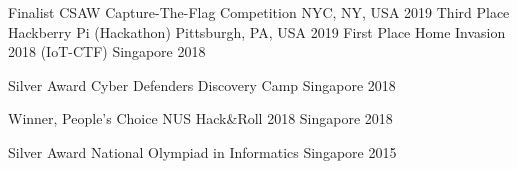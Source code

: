 


\begin{cvhonors}

  \cvhonor
    {Finalist} %
    {CSAW Capture-The-Flag Competition} %
    {NYC, NY, USA} %
    {2019} %
  \cvhonor
    {Third Place} %
    {Hackberry Pi (Hackathon)} %
    {Pittsburgh, PA, USA} %
    {2019} %
  \cvhonor
    {First Place} %
    {Home Invasion 2018 (IoT-CTF)} %
    {Singapore} %
    {2018} %

  \cvhonor
    {Silver Award} %
    {Cyber Defenders Discovery Camp} %
    {Singapore} %
    {2018} %

  \cvhonor
    {Winner, People's Choice} %
    {NUS Hack\&Roll 2018} %
    {Singapore} %
    {2018} %

  \cvhonor
    {Silver Award} %
    {National Olympiad in Informatics} %
    {Singapore} %
    {2015} %

\end{cvhonors}
